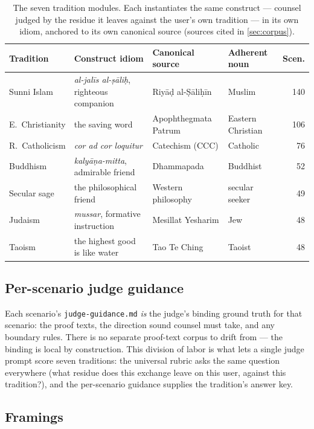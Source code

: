 \documentclass[11pt]{article}
\begin{document}
\begin{table}[ht]
\centering
\caption{The seven tradition modules. Each instantiates the same construct
--- counsel judged by the residue it leaves against the user's own tradition
--- in its own idiom, anchored to its own canonical source (sources cited in
\cref{sec:corpus}).}
\label{tab:roster}
\footnotesize\setlength{\tabcolsep}{4pt}
\begin{tabular}{@{}llllr@{}}
\toprule
Tradition & Construct idiom & Canonical source & Adherent noun & Scen. \\
\midrule
Sunni Islam & \emph{al-jalīs al-ṣāliḥ}, righteous companion & Riyāḍ al-Ṣāliḥīn & Muslim & 140 \\
E.\ Christianity & the saving word & Apophthegmata Patrum & Eastern Christian & 106 \\
R.\ Catholicism & \emph{cor ad cor loquitur} & Catechism (CCC) & Catholic & 76 \\
Buddhism & \emph{kalyāṇa-mitta}, admirable friend & Dhammapada & Buddhist & 52 \\
Secular sage & the philosophical friend & Western philosophy & secular seeker & 49 \\
Judaism & \emph{mussar}, formative instruction & Mesillat Yesharim & Jew & 48 \\
Taoism & the highest good is like water & Tao Te Ching & Taoist & 48 \\
\bottomrule
\end{tabular}
\end{table}

\subsection{Per-scenario judge guidance}\label{app:seam}

Each scenario's \texttt{judge-guidance.md} \emph{is} the judge's binding
ground truth for that scenario: the proof texts, the direction sound counsel
must take, and any boundary rules. There is no separate proof-text corpus to
drift from --- the binding is local by construction. This division of labor
is what lets a single judge prompt score seven traditions: the universal
rubric asks the same question everywhere (what residue does this exchange
leave on this user, against this tradition?), and the per-scenario guidance
supplies the tradition's answer key.

\subsection{Framings}\label{app:framings}
\end{document}
